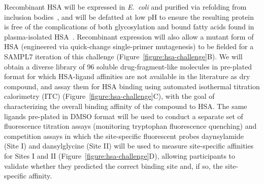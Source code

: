 \documentclass[11pt]{article}
\begin{document}
Recombinant HSA will be expressed in \emph{E.~coli} and purified via refolding from inclusion bodies~\cite{Latta:1987:Bio/Technology}, and will be defatted at low pH to ensure the resulting protein is free of the complications of both glycosylation and bound fatty acids found in plasma-isolated HSA~\cite{Lang:2015:BiotechnologyProgress}.
Recombinant expression will also allow a mutant form of HSA (engineered via quick-change single-primer mutagenesis) to be fielded for a SAMPL7 iteration of this challenge (Figure~\ref{figure:hsa-challenge}B).
We will obtain a diverse library of 96 soluble drug-fragment-like molecules in pre-plated format for which HSA-ligand affinities are not available in the literature as dry compound, and assay them for HSA binding using automated isothermal titration calorimetry (ITC) (Figure~\ref{figure:hsa-challenge}C), with the goal of characterizing the overall binding affinity of the compound to HSA.
The same ligands pre-plated in DMSO format will be used to conduct a separate set of fluorescence titration assays (monitoring tryptophan fluorescence quenching) and competition assays in which the site-specific fluorescent probes daynsylamide (Site I) and dansylglycine (Site II) will be used to measure site-specific affinities for Sites I and II (Figure~\ref{figure:hsa-challenge}D), allowing participants to validate whether they predicted the correct binding site and, if so, the site-specific affinity.
\end{document}
